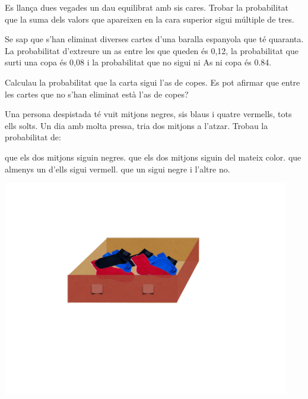 \begin{mylist}
\exer  Es llança dues vegades un dau equilibrat amb sis cares. Trobar la probabilitat que la suma dels valors que apareixen en la cara superior sigui múltiple de tres. 
  

 \exer \hot Se sap que s'han eliminat diverses cartes d'una baralla espanyola que té quaranta. La  probabilitat d'extreure un as entre les que queden és 0,12, la probabilitat que surti una copa és 0,08 i la probabilitat que no sigui ni As ni copa és 0.84. 

 Calculau la probabilitat que la carta sigui l'as de copes. Es pot afirmar que entre les cartes que no s'han eliminat està l'as de copes?
 

\exer[1] Una persona despistada té vuit mitjons negres, sis blaus i quatre vermells, tots ells solts. Un dia amb molta pressa, tria dos mitjons a l'atzar. Trobau la probabilitat de:  

\begin{minipage}{0.65\textwidth}	
	\begin{tasks}
		\task  que els dos mitjons siguin negres. 
		\task  que els dos mitjons siguin del mateix color.
		\task  que  almenys un d'ells sigui vermell.
		\task  que un sigui negre i l'altre no.
	\end{tasks}
\end{minipage}
\begin{minipage}{0.29\textwidth}
	\centering
	\includegraphics[width=0.94\textwidth]{img-04/calcetins}
\end{minipage}


\end{mylist}
